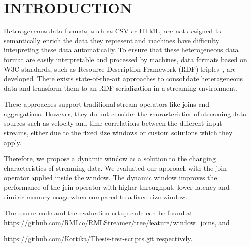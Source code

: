 \section{INTRODUCTION}
\label{chap:intro}

Heterogeneous data formats, such as CSV or HTML, are not
designed to semantically enrich the data they represent and 
machines have difficulty interpreting these data automatically. 
To ensure that these heterogeneous data format are easily interpretable and 
processed by machines, data formats based on W3C standards, such as Resource Description 
Framework (RDF) triples~\cite{intro_rdf}, are developed. 
There exists state-of-the-art approaches to consolidate heterogeneous data
and transform them to an RDF serialization in a streaming environment. 

These approaches support traditional stream operators like joins and aggregations. 
However, they do not consider
the characteristics of streaming data sources such as velocity and 
time-correlations between the different
input streams, either due to the 
fixed size windows or custom solutions which they apply. 

Therefore, we propose a dynamic window as a solution to the 
changing characteristics of streaming data. We evaluated our 
approach with the join operator applied inside the window. 
The dynamic window improves the performance of the 
join operator with higher throughput, lower latency and 
similar memory usage when compared to a fixed size window.

The source code and the evaluation setup code can be found at
\url{https://github.com/RMLio/RMLStreamer/tree/feature/window_joins}, and 

\href{https://github.com/Kortika/Thesis-test-scripts.git}{https://github.com/Kortika/Thesis-test-scripts.git} respectively.
